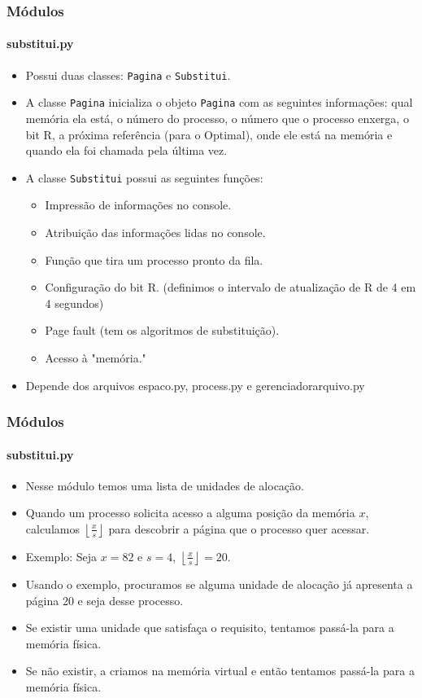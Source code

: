 \documentclass{beamer}
\begin{document}
\begin{frame}
	\frametitle{Módulos}
	\framesubtitle{substitui.py}
	\begin{itemize}
		\item Possui duas classes: \texttt{Pagina} e \texttt{Substitui}.
		\item A classe \texttt{Pagina} inicializa o objeto \texttt{Pagina} com as seguintes informações: qual memória ela está, o número do processo, o número que o processo enxerga, o bit R, a próxima referência (para o Optimal), onde ele está na memória e quando ela foi chamada pela última vez.
		\item A classe \texttt{Substitui} possui as seguintes funções:
		\begin{itemize}
			\item Impressão de informações no console.
			\item Atribuição das informações lidas no console.
			\item Função que tira um processo pronto da fila.
			\item Configuração do bit R. (definimos o intervalo de atualização de R de 4 em 4 segundos)
			\item Page fault (tem os algoritmos de substituição).
			\item Acesso à "memória."
		\end{itemize}
		\item Depende dos arquivos espaco.py, process.py e gerenciador\textunderscore arquivo.py
	\end{itemize}
\end{frame}

\begin{frame}
	\frametitle{Módulos}
	\framesubtitle{substitui.py}
	\begin{itemize}
		\item Nesse módulo temos uma lista de unidades de alocação.
		\item Quando um processo solicita acesso a alguma posição da memória $x$, calculamos $\left \lfloor{\frac{x}{s}}\right \rfloor$ para descobrir a página que o processo quer acessar.
		\item Exemplo: Seja $x = 82$ e $s = 4$, $\left \lfloor{\frac{x}{s}}\right \rfloor = 20$. 
		\item Usando o exemplo, procuramos se alguma unidade de alocação já apresenta a página 20 e seja desse processo.
		\item Se existir uma unidade que satisfaça o requisito, tentamos passá-la para a memória física.
		\item Se não existir, a criamos na memória virtual e então tentamos passá-la para a memória física.
	\end{itemize}
\end{frame}
\end{document}
